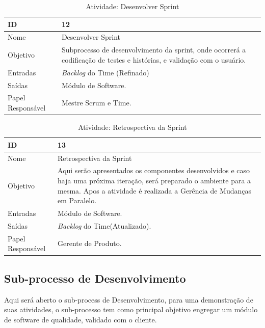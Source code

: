   \begin{table}[H]
    \centering
      \begin{tabular}{| m{5em} | m{10cm} |}
        \hline
        ID       & 12   \\ \hline
        Nome     & Desenvolver  Sprint  \\ \hline
        Objetivo & Subprocesso de desenvolvimento da sprint, onde ocorrerá a codificação de testes e histórias, e validação com o usuário.  \\ \hline
        Entradas & \textit{Backlog} do Time (Refinado)\\ \hline
        Saídas   & Módulo de Software. \\ \hline
        Papel Responsável   & Mestre Scrum e Time. \\ \hline
      \end{tabular}
      \caption{Atividade: Desenvolver  Sprint}
      \label{tabela:atividade12}
  \end{table}

  \begin{table}[H]
    \centering
      \begin{tabular}{| m{5em} | m{10cm} |}
        \hline
        ID       & 13   \\ \hline
        Nome     & Retrospectiva da Sprint  \\ \hline
        Objetivo & Aqui serão apresentados os componentes desenvolvidos e caso haja uma próxima iteração, será preparado o ambiente para a mesma. Apos a atividade é realizada a Gerência de Mudanças em Paralelo.  \\ \hline
        Entradas & Módulo de Software. \\ \hline
        Saídas   & \textit{Backlog} do Time(Atualizado). \\ \hline
        Papel Responsável   & Gerente de Produto. \\ \hline
      \end{tabular}
      \caption{Atividade: Retrospectiva da Sprint}
      \label{tabela:atividade13}
  \end{table}

  \subsection{Sub-processo de Desenvolvimento}

  Aqui será aberto o sub-process de Desenvolvimento, para uma demonstração de suas atividades, o sub-processo tem como principal objetivo
  engregar um módulo de software de qualidade, validado com o cliente.

